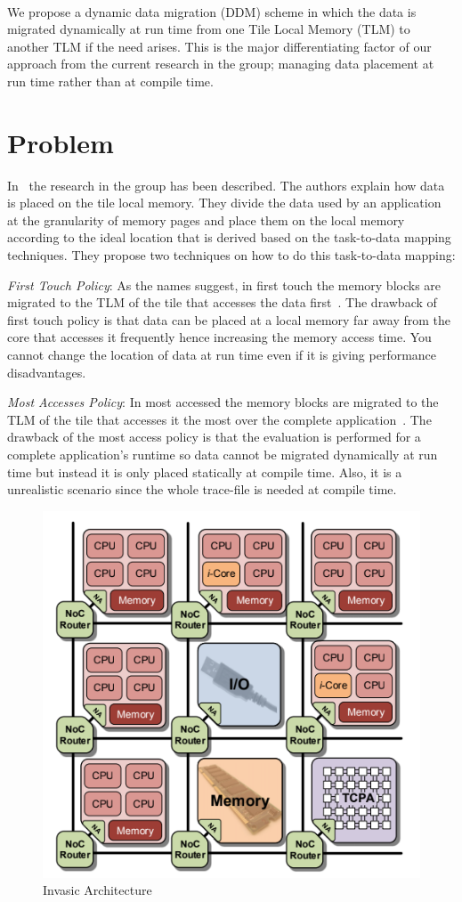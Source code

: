 \documentclass{listhesis}
\begin{document}
\\
We propose a dynamic data migration (DDM) scheme in which the data is migrated dynamically at run time from one Tile Local Memory (TLM) to another TLM if the need arises. This is the major differentiating factor of our approach from the current research in the group; managing data placement at run time rather than at compile time.
\section{Problem}
In~\cite{lispaper} the research in the group has been described. The authors explain how data is placed on the tile local memory. They divide the data used by an application at the granularity of memory pages and place them on the local memory according to the ideal location that is derived based on the task-to-data mapping techniques. They propose two techniques on how to do this task-to-data mapping:\\
\par
\textit{First Touch Policy}: As the names suggest, in first touch the memory blocks are migrated to the TLM of the tile that accesses the data first~\cite{lispaper}. The drawback of first touch policy is that data can be placed at a local memory far away from the core that accesses it frequently hence increasing the memory access time. You cannot change the location of data at run time even if it is giving performance disadvantages.\\ 
\par
\textit{Most Accesses Policy}: In most accessed the memory blocks are migrated to the TLM of the tile that accesses it the most over the complete application~\cite{lispaper}. The drawback of the most access policy is that the evaluation is performed for a complete application's runtime so data cannot be migrated dynamically at run time but instead it is only placed statically at compile time. Also, it is a unrealistic scenario since the whole trace-file is needed at compile time. 
\begin{figure}[h!]
  \includegraphics[width=0.7\linewidth]{multi-core,tile.png}
  \centering
  \caption{Invasic Architecture~\cite{iNetworkAdapter}}
  \label{fig:multi-core,tile}
\end{figure}
\end{document}
